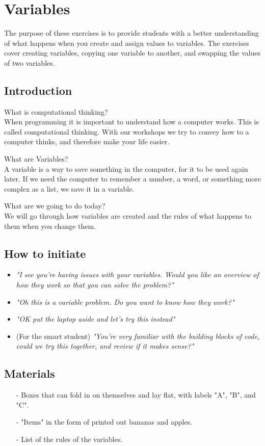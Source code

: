 \section{Variables}
The purpose of these exercises is to provide students with a better understanding of what happens when you create and assign values to variables. The exercises cover creating variables, copying one variable to another, and swapping the values of two variables.

\subsection{Introduction}
What is computational thinking?\\
When programming it is important to understand how a computer works. This is called computational thinking. With our workshops we try to convey how to a computer thinks, and therefore make your life easier. 

What are Variables?\\
A variable is a way to save something in the computer, for it to be used again later. If we need the computer to remember a number, a word, or something more complex as a list, we save it in a variable. 

What are we going to do today?\\
We will go through how variables are created and the rules of what happens to them when you change them. 

\subsection*{How to initiate}
\begin{itemize}
    \item \textit{"I see you're having issues with your variables. Would you like an overview of how they work so that you can solve the problem?"}
    \item \textit{"Oh this is a variable problem. Do you want to know how they work?"}
    \item \textit{"OK put the laptop aside and let's try this instead"}
    \item (For the smart student) \textit{"You're very familiar with the building blocks of code, could we try this together, and review if it makes sense?"}
\end{itemize}


\subsection*{Materials}
\begin{itemize}
    \item[-] Boxes that can fold in on themselves and lay flat, with labels "A", "B", and "C".
    \item[-] "Items" in the form of printed out bananas and apples.
    \item[-] List of the rules of the variables.
\end{itemize}

